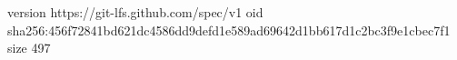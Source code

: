 version https://git-lfs.github.com/spec/v1
oid sha256:456f72841bd621dc4586dd9defd1e589ad69642d1bb617d1c2bc3f9e1cbec7f1
size 497
